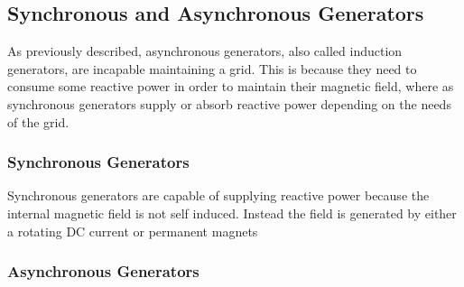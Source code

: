 
\subsection{Synchronous and Asynchronous Generators}
As previously described, asynchronous generators, also called induction generators, are incapable maintaining a grid. This is because they need to consume some reactive power in order to maintain their magnetic field, where as synchronous generators supply or absorb reactive power depending on the needs of the grid.

\subsubsection{Synchronous Generators}
Synchronous generators are capable of supplying reactive power because the internal magnetic field is not self induced. Instead the field is generated by either a rotating DC current or permanent magnets
\subsubsection{Asynchronous Generators}


